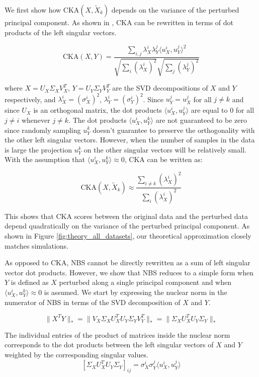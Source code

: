 \documentclass{article} %
\begin{document}
We first show how $\text{CKA}(X, \tilde{X}_k)$ depends on the variance of the perturbed principal component. As shown in \citep{Kornblith2019}, CKA can be rewritten in terms of dot products of the left singular vectors.

$$\text{CKA}(X, Y) = \dfrac{\sum_{i, j} \lambda_X^i \lambda_Y^j \langle u_X^i, u_Y^j \rangle^2}{\sqrt{\sum_i (\lambda_X^i)^2}\sqrt{\sum_j (\lambda_Y^j)^2}}$$

where $X = U_X\Sigma_X V^T_X$, $Y = U_Y\Sigma_Y V^T_Y$ are the SVD decompositions of $X$ and $Y$ respectively, and $\lambda_X^i = (\sigma_X^i)^2$, $\lambda_Y^i = (\sigma_Y^i)^2$. Since $u_Y^j = u_X^j$ for all $j \neq k$ and since $U_X$ is an orthogonal matrix, the dot products $\langle u_X^i, u_Y^j \rangle$ are equal to $0$ for all $j \ne i$ whenever $j \ne k$. The dot products $\langle u_X^i, u_Y^k \rangle$ are not guaranteed to be zero since randomly sampling $u_Y^k$ doesn't guarantee to preserve the orthogonality with the other left singular vectors. However, when the number of samples in the data is large the projection $u_Y^k$ on the other singular vectors will be relatively small. With the assumption that $\langle u_X^i, u_Y^k \rangle \approx 0$, CKA can be written as:

$$\text{CKA}(X, \tilde{X}_k) \approx \dfrac{\sum_{i \ne k} (\lambda_X^i)^2}{\sum_i (\lambda_X^i)^2}$$


This shows that CKA scores between the original data and the perturbed data depend quadratically on the variance of the perturbed principal component. As shown in Figure \ref{fig:theory_all_datasets}, our theoretical approximation closely matches simulations.


As opposed to CKA, NBS cannot be directly rewritten as a sum of left singular vector dot products. However, we show that NBS reduces to a simple form when $Y$ is defined as $X$ perturbed along a single principal component and when $\langle u_X^i, u_Y^k \rangle \approx 0$ is assumed. We start by expressing the nuclear norm in the numerator of NBS in terms of the SVD decomposition of $X$ and $Y$.

$$\|X^TY\|_* = \|V_X\Sigma_XU^T_X U_Y\Sigma_Y V^T_Y \|_* = \|\Sigma_XU^T_X U_Y\Sigma_Y \|_*$$

The individual entries of the product of matrices inside the nuclear norm corresponds to the dot products between the left singular vectors of $X$ and $Y$ weighted by the corresponding singular values.
$$[\Sigma_X U_X^T U_Y \Sigma_Y]_{ij} = \sigma^i_X \sigma^j_Y \langle u_X^i, u_Y^j \rangle$$
\end{document}
